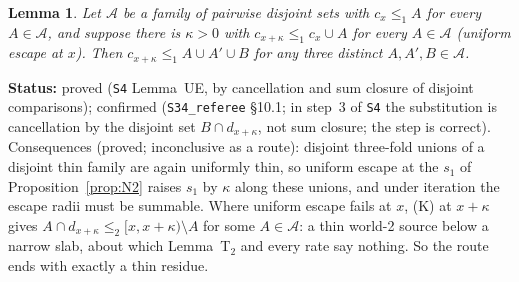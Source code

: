 \documentclass[11pt]{article}
\newtheorem{lemma}[theorem]{Lemma}
\theoremstyle{definition}
\theoremstyle{remark}
\newcommand{\src}[1]{\texttt{#1}}
\newcommand{\status}[1]{\par\smallskip\noindent\textbf{Status:} #1\par\smallskip}
\begin{document}
\begin{lemma}\label{lem:UE}
Let $\mathcal A$ be a family of pairwise disjoint sets with $c_x\le_1A$ for every $A\in\mathcal A$, and suppose there is $\kappa>0$ with $c_{x+\kappa}\le_1c_x\cup A$ for every $A\in\mathcal A$ (\emph{uniform escape at $x$}). Then $c_{x+\kappa}\le_1A\cup A'\cup B$ for any three distinct $A,A',B\in\mathcal A$.
\end{lemma}
\status{proved (\src{S4} Lemma~UE, by cancellation and sum closure of disjoint comparisons); confirmed (\src{S34\_referee} \S10.1; in step~3 of \src{S4} the substitution is cancellation by the disjoint set $B\cap d_{x+\kappa}$, not sum closure; the step is correct). Consequences (proved; inconclusive as a route): disjoint three-fold unions of a disjoint thin family are again uniformly thin, so uniform escape at the $s_1$ of Proposition~\ref{prop:N2} raises $s_1$ by $\kappa$ along these unions, and under iteration the escape radii must be summable. Where uniform escape fails at $x$, (K) at $x+\kappa$ gives $A\cap d_{x+\kappa}\le_2[x,x+\kappa)\setminus A$ for some $A\in\mathcal A$: a thin world-2 source below a narrow slab, about which Lemma~T$_2$ and every rate say nothing. So the route ends with exactly a thin residue.}
\end{document}
